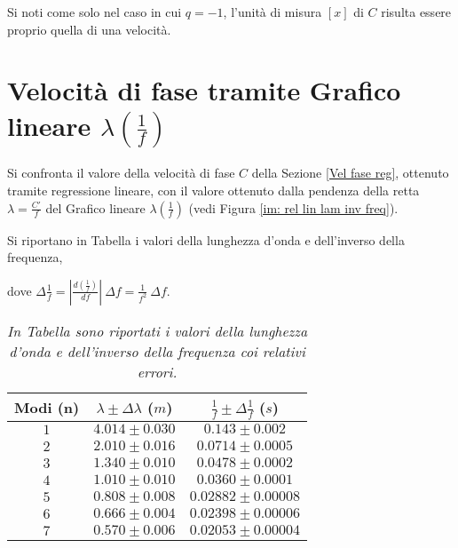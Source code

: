 \documentclass[12pt, a4paper]{article}
\begin{document}
Si noti come solo nel caso in cui $q=-1$, l'unità di misura $[x]$ di $C$ risulta essere proprio quella di una velocità.

\section{Velocità di fase tramite Grafico lineare $\lambda(  \frac{1}{f}) $}


Si confronta il valore della velocità di fase $C$ della Sezione \ref{Vel fase reg}, ottenuto tramite regressione lineare, con il valore ottenuto dalla pendenza della retta $\lambda=\frac{C'}{f}$ del Grafico lineare $\lambda(\frac{1}{f})$ (vedi Figura \ref{im: rel lin lam inv freq}).

Si riportano in Tabella i valori della lunghezza d'onda e dell'inverso della frequenza, 

dove $\displaystyle  \Delta \frac{1}{f}=\left| \frac{d(\frac{1}{f})}{df}\right|\ \Delta f=\frac{1}{f^2}\ \Delta f$.



\addvspace{1cm}
{

\renewcommand\arraystretch{1.08}
\begin{table}[ht] %
 \centering

\begin{tabular}{|c|c|c|} 
 \hline
  {Modi (n)}& {$\lambda\pm\Delta\lambda$ ($m$)}  & {$ \frac{1}{f}\pm \Delta \frac{1}{f} $ ($s$)} \\ 
\hline
 $1$ & \footnotesize{$4.014\pm0.030$} & \footnotesize{$0.143\pm0.002$} \\   
 $2$ & \footnotesize{$2.010\pm0.016$} & \footnotesize{$0.0714\pm0.0005$} \\
 $3$ & \footnotesize{$1.340\pm0.010$} & \footnotesize{$0.0478\pm0.0002$} \\
 $4$ & \footnotesize{$1.010\pm0.010$} & \footnotesize{$0.0360\pm0.0001$} \\
 $5$ & \footnotesize{$0.808\pm0.008$} & \footnotesize{$0.02882\pm0.00008$} \\
 $6$ & \footnotesize{$0.666\pm0.004$} & \footnotesize{$0.02398\pm0.00006$} \\
 $7$ & \footnotesize{$0.570\pm0.006$} & \footnotesize{$0.02053\pm0.00004$} \\
\hline

\end{tabular}
\caption{\small{\textit{In Tabella sono riportati i valori della lunghezza d'onda e dell'inverso della frequenza coi relativi errori.} }}
    \label{tab:lambda inv frequenza}
\end{table}

}
\end{document}
